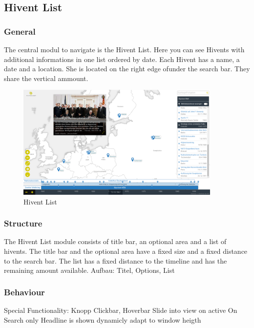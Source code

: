 \subsection{Hivent List} %
\label{sub:hivent_list}

\subsubsection{General} %
\label{ssub:general_hl}
The central modul to navigate \HG is the Hivent List. Here you can see Hivents with additional informations in one list ordered by date. Each Hivent has a name, a date and a location. She is located on the right edge of\HG under the search bar. They share the vertical ammount.

\begin{figure}[H]
  \centering
  \includegraphics[width=0.9\textwidth]{graphics/final_ui.png}
  \caption{Hivent List}
\end{figure}

\subsubsection{Structure} %
\label{ssub:structure_hl}
The Hivent List module consists of title bar, an optional area and a list of hivents. The title bar and the optional area have a fixed size and a fixed distance to the search bar. The list has a fixed distance to the timeline and has the remaining amount available. 
Aufbau: Titel, Options, List


\subsubsection{Behaviour} %
\label{ssub:behaviour_hl}
Special Functionality: Knopp
Clickbar, Hoverbar
Slide into view on active
On Search only Headline is shown
dynamicly adapt to window heigth

